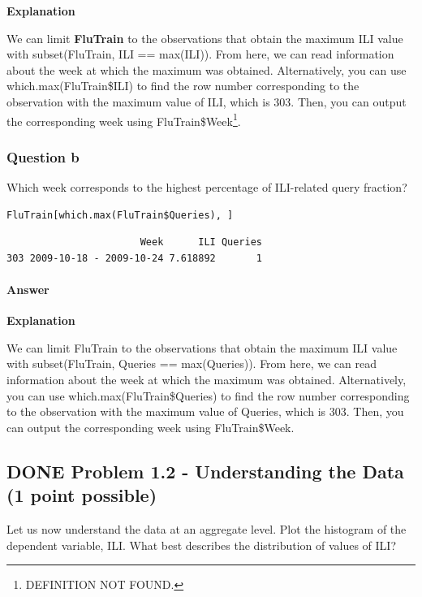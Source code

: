 \documentclass[letterpaper, 9pt, onecolumn, twoside, technote, final]{IEEEtran}
\begin{document}
\textbf{Explanation}

We can limit \textbf{FluTrain} to the observations that obtain the maximum ILI
value with subset(FluTrain, ILI == max(ILI)). From here, we can read
information about the week at which the maximum was
obtained. Alternatively, you can use which.max(FluTrain\$ILI) to find
the row number corresponding to the observation with the maximum value
of ILI, which is 303. Then, you can output the corresponding week
using FluTrain\$Week\footnote{DEFINITION NOT FOUND.}.

\subsubsection{Question b}
\label{sec-3-1-4}

Which week corresponds to the highest percentage of ILI-related query
fraction?

\begin{verbatim}
FluTrain[which.max(FluTrain$Queries), ]
\end{verbatim}

\begin{verbatim}
                       Week      ILI Queries
303 2009-10-18 - 2009-10-24 7.618892       1
\end{verbatim}

\paragraph{Answer}
\label{sec-3-1-4-1}

\textbf{Explanation}

We can limit FluTrain to the observations that obtain the maximum ILI
value with subset(FluTrain, Queries == max(Queries)). From here, we
can read information about the week at which the maximum was
obtained. Alternatively, you can use which.max(FluTrain\$Queries) to
find the row number corresponding to the observation with the maximum
value of Queries, which is 303. Then, you can output the corresponding
week using FluTrain\$Week\footnotemark[1]{}.

\subsection{{\bfseries\sffamily DONE} Problem 1.2 - Understanding the Data (1 point possible)}
\label{sec-3-2}
Let us now understand the data at an aggregate level. Plot the
histogram of the dependent variable, ILI. What best describes the
distribution of values of ILI?
\end{document}
